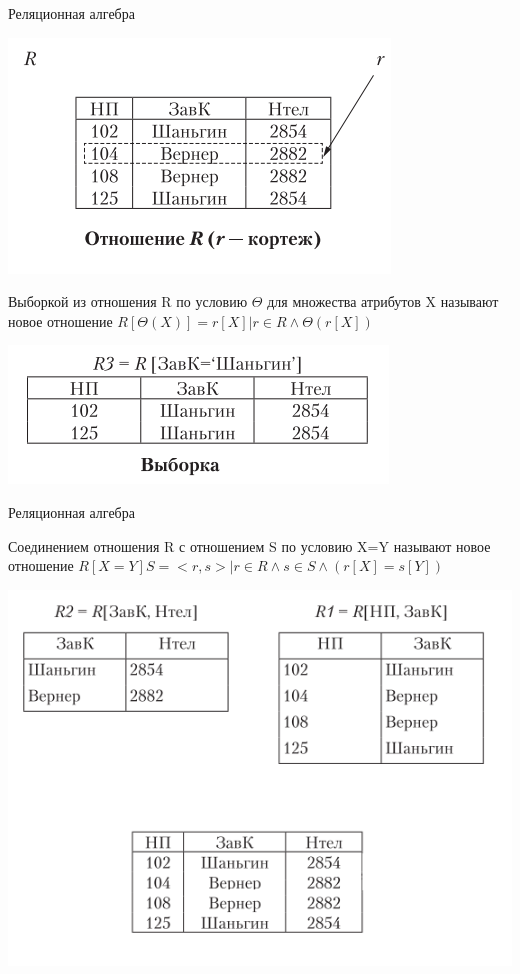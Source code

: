 \documentclass{beamer}
\begin{document}
\begin{frame}{Реляционная алгебра}
\begin{center}
\includegraphics[scale=0.40]{images/ra-01.png}
\end{center}
\begin{block}{Выборкой из отношения R по условию $\Theta$ для множества атрибутов X}
называют новое отношение $R[\Theta(X)]= {r[X]|r \in R\wedge\Theta(r[X])}$
\end{block}
\begin{center}
\includegraphics[scale=0.50]{images/ra-03.png}
\end{center}
\end{frame}

\begin{frame}{Реляционная алгебра}
\begin{block}{Соединением отношения R с отношением S по условию X=Y}
называют новое отношение $R[X=Y]S = {<r,s>|r\in R\wedge s\in S\wedge(r[X]=s[Y])}$
\end{block}
\begin{center}
\includegraphics[scale=0.50]{images/ra-04.png}
\end{center}
\end{frame}
\end{document}
